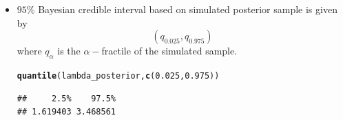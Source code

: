 \documentclass[11pt, a4paper]{article}\usepackage[]{graphicx}\usepackage[]{xcolor}
\makeatletter
\newcommand{\hlnum}[1]{\textcolor[rgb]{0.686,0.059,0.569}{#1}}%
\newcommand{\hldef}[1]{\textcolor[rgb]{0.345,0.345,0.345}{#1}}%
\newcommand{\hlkwd}[1]{\textcolor[rgb]{0.737,0.353,0.396}{\textbf{#1}}}%
\newenvironment{kframe}{%
 \def\at@end@of@kframe{}%
 \ifinner\ifhmode%
  \def\at@end@of@kframe{\end{minipage}}%
  \begin{minipage}{\columnwidth}%
 \fi\fi%
 \def\FrameCommand##1{\hskip\@totalleftmargin \hskip-\fboxsep
 \colorbox{shadecolor}{##1}\hskip-\fboxsep
     \hskip-\linewidth \hskip-\@totalleftmargin \hskip\columnwidth}%
 \MakeFramed {\advance\hsize-\width
   \@totalleftmargin\z@ \linewidth\hsize
   \@setminipage}}%
 {\par\unskip\endMakeFramed%
 \at@end@of@kframe}
\newenvironment{knitrout}{}{} %
\makeatother
\begin{document}
\begin{itemize}
\item[\scalebox{2.0}{\twemoji{keycap: 4}}] $95\%$ Bayesian credible interval based on simulated posterior sample is given by $$(q_{0.025}, q_{0.975})$$ where $q_{\alpha}$ is the $\alpha-$fractile of the simulated sample.

\begin{knitrout}
\color{fgcolor}\begin{kframe}
\begin{alltt}
\hlkwd{quantile}\hldef{(lambda_posterior,} \hlkwd{c}\hldef{(}\hlnum{0.025}\hldef{,} \hlnum{0.975}\hldef{))}
\end{alltt}
\begin{verbatim}
##     2.5%    97.5% 
## 1.619403 3.468561
\end{verbatim}
\end{kframe}
\end{knitrout}

\end{itemize}
\end{document}
